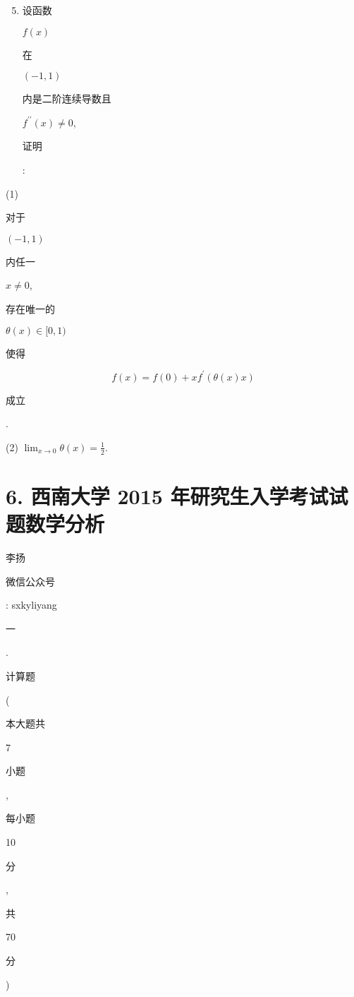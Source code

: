 \documentclass[10pt]{article}
\begin{document}
\begin{enumerate}
  \setcounter{enumi}{4}
  \item \begin{CJK}{UTF8}{mj}设函数\end{CJK} $f(x)$ \begin{CJK}{UTF8}{mj}在\end{CJK} $(-1,1)$ \begin{CJK}{UTF8}{mj}内是二阶连续导数且\end{CJK} $f^{\prime \prime}(x) \neq 0$, \begin{CJK}{UTF8}{mj}证明\end{CJK}:
\end{enumerate}
(1) \begin{CJK}{UTF8}{mj}对于\end{CJK} $(-1,1)$ \begin{CJK}{UTF8}{mj}内任一\end{CJK} $x \neq 0$, \begin{CJK}{UTF8}{mj}存在唯一的\end{CJK} $\theta(x) \in[0,1)$ \begin{CJK}{UTF8}{mj}使得\end{CJK}
$$
f(x)=f(0)+x f^{\prime}(\theta(x) x)
$$
\begin{CJK}{UTF8}{mj}成立\end{CJK}.

(2) $\lim _{x \rightarrow 0} \theta(x)=\frac{1}{2}$.

\section{6. 西南大学 2015 年研究生入学考试试题数学分析}
\begin{CJK}{UTF8}{mj}李扬\end{CJK}

\begin{CJK}{UTF8}{mj}微信公众号\end{CJK}: sxkyliyang

\begin{CJK}{UTF8}{mj}一\end{CJK}. \begin{CJK}{UTF8}{mj}计算题\end{CJK} (\begin{CJK}{UTF8}{mj}本大题共\end{CJK} 7 \begin{CJK}{UTF8}{mj}小题\end{CJK}, \begin{CJK}{UTF8}{mj}每小题\end{CJK} 10 \begin{CJK}{UTF8}{mj}分\end{CJK}, \begin{CJK}{UTF8}{mj}共\end{CJK} 70 \begin{CJK}{UTF8}{mj}分\end{CJK})
\end{document}
